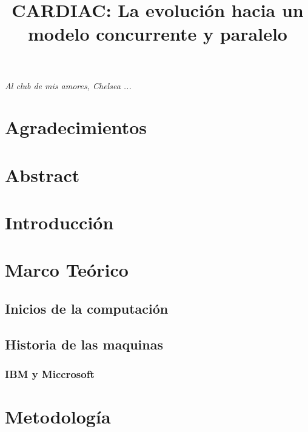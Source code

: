 \documentclass[letterpaper,12pt,oneside]{book}
\title{CARDIAC: La evolución hacia un modelo concurrente y paralelo}
\begin{document}
	\frontmatter

    

\chapter*{}
\begin{flushright}%
  \emph{Al club de mis amores, Chelsea ...}
  \thispagestyle{empty}
\end{flushright}

\chapter{Agradecimientos}

\chapter{Abstract}

\chapter{Introducción}


\tableofcontents
\listoffigures

\mainmatter

\chapter{Marco Teórico} %


\section{Inicios de la computación}
   
\section{Historia de las maquinas} 
    \subsection{IBM y Miccrosoft}


\chapter{Metodología}  %
\end{document}
